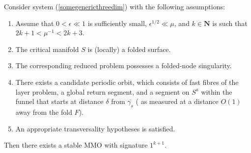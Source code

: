 \begin{theorem} \label{MMOsigk1}
Consider system (\ref{somegenericthreedim}) with the following assumptions:
\begin{enumerate}
\item Assume that $ 0 < \epsilon \ll 1$ is sufficiently small, $\epsilon^{1/2} \ll \mu$, and $k \in \mathbf{N}$ is such that $2k + 1 < \mu^{-1} < 2k + 3$.
\item The critical manifold $S$ is (locally) a folded surface.
\item The corresponding reduced problem possesses a folded-node singularity.
\item There exists a candidate periodic orbit, which consists of fast fibres of the layer problem, a global return segment, and a segment on $S^a$ within the funnel that starts at distance $\delta$ from $\overline{\gamma_s}$ ( as measured at a distance $O(1)$ away from the fold $F$).
\item An appropriate transversality hypotheses is satisfied.
\end{enumerate}
Then there exists a stable MMO with signature $1^{k+1}$.
\end{theorem}

